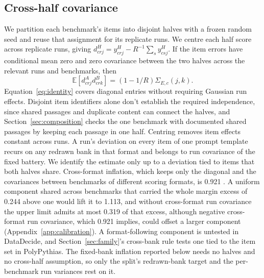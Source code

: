\subsection{Cross-half covariance}
We partition each benchmark's items into disjoint halves with a frozen random seed and reuse that assignment for its replicate runs. We centre each half score across replicate runs, giving $d^H_{crj}=y^H_{crj}-R^{-1}\sum_s y^H_{csj}$. If the item errors have conditional mean zero and zero covariance between the two halves across the relevant runs and benchmarks, then
\begin{equation}
\mathbb{E}[d^A_{crj}d^B_{crk}]=(1-1/R)\Sigma_{E,c}(j,k).
\label{eq:identity}
\end{equation}
Equation~\ref{eq:identity} covers diagonal entries without requiring Gaussian run effects. Disjoint item identifiers alone don't establish the required independence, since shared passages and duplicate content can connect the halves, and Section~\ref{sec:composition} checks the one benchmark with documented shared passages by keeping each passage in one half. Centring removes item effects constant across runs. A run's deviation on every item of one prompt template recurs on any redrawn bank in that format and belongs to run covariance of the fixed battery. We identify the estimate only up to a deviation tied to items that both halves share. Cross-format inflation, which keeps only the diagonal and the covariances between benchmarks of different scoring formats, is 0.921 . A uniform component shared across benchmarks that carried the whole margin excess of 0.244 above one would lift it to 1.113, and without cross-format run covariance the upper limit admits at most 0.319 of that excess, although negative cross-format run covariance, which 0.921 implies, could offset a larger component (Appendix~\ref{app:calibration}). A format-following component is untested in DataDecide, and Section~\ref{sec:family}'s cross-bank rule tests one tied to the item set in PolyPythias. The fixed-bank inflation reported below needs no halves and no cross-half assumption, so only the split's redrawn-bank target and the per-benchmark run variances rest on it.

